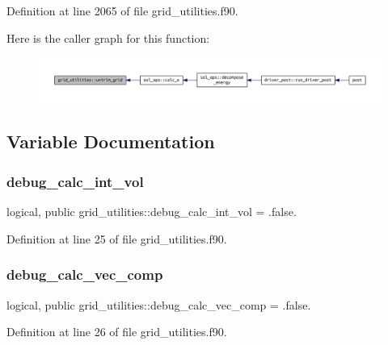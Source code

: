 Definition at line 2065 of file grid\+\_\+utilities.\+f90.

Here is the caller graph for this function\+:
\nopagebreak
\begin{figure}[H]
\begin{center}
\leavevmode
\includegraphics[width=350pt]{namespacegrid__utilities_a4679f24af8e02793070f4e27b43e00b6_icgraph}
\end{center}
\end{figure}


\subsection{Variable Documentation}
\mbox{\label{namespacegrid__utilities_a0743c0341d508034b14aee614fa4f8a9}} 
\subsubsection{\texorpdfstring{debug\+\_\+calc\+\_\+int\+\_\+vol}{debug\_calc\_int\_vol}}
{\footnotesize\ttfamily logical, public grid\+\_\+utilities\+::debug\+\_\+calc\+\_\+int\+\_\+vol = .false.}



Definition at line 25 of file grid\+\_\+utilities.\+f90.

\mbox{\label{namespacegrid__utilities_ab420036236dc8a9a69e180550499d95b}} 
\subsubsection{\texorpdfstring{debug\+\_\+calc\+\_\+vec\+\_\+comp}{debug\_calc\_vec\_comp}}
{\footnotesize\ttfamily logical, public grid\+\_\+utilities\+::debug\+\_\+calc\+\_\+vec\+\_\+comp = .false.}



Definition at line 26 of file grid\+\_\+utilities.\+f90.

